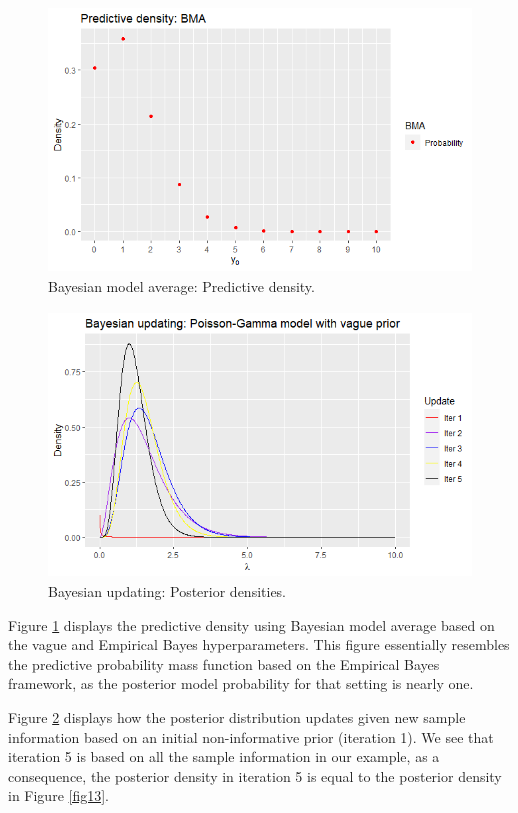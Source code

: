 \begin{figure}[!h]
	\includegraphics[width=340pt, height=200pt]{Chapters/chapter1/figures/BMA.png}
	\caption[List of figure caption goes here]{Bayesian model average: Predictive density.}\label{fig15}
\end{figure}

\begin{figure}[!h]
	\includegraphics[width=340pt, height=200pt]{Chapters/chapter1/figures/Updating.png}
	\caption[List of figure caption goes here]{Bayesian updating: Posterior densities.}\label{fig16}
\end{figure}

Figure \ref{fig15} displays the predictive density using Bayesian model average based on the vague and Empirical Bayes hyperparameters. This figure essentially resembles the predictive probability mass function based on the Empirical Bayes framework, as the posterior model probability for that setting is nearly one.

Figure \ref{fig16} displays how the posterior distribution updates given new sample information based on an initial non-informative prior (iteration 1). We see that iteration 5 is based on all the sample information in our example, as a consequence, the posterior density in iteration 5 is equal to the posterior density in Figure \ref{fig13}.

